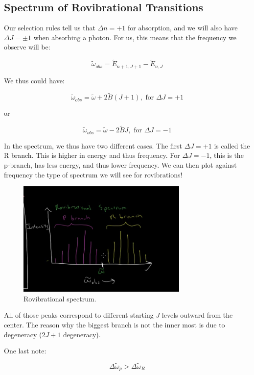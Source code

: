 \documentclass{article}
\newcommand{\be}{\begin{equation}}
\newcommand{\ee}{\end{equation}}
\begin{document}
\subsection{Spectrum of Rovibrational Transitions}

Our selection rules tell us that $\Delta n = +1$ for absorption, and we will also have $\Delta J = \pm 1$ when absorbing a photon. For us, this means that the frequency we observe will be:

\be
\tilde \omega_{obs} = \tilde E_{n+1, J+1} - \tilde E_{n, J}
\ee

We thus could have:

\be
\tilde \omega_{obs} = \tilde \omega + 2\tilde B \left(J+1\right), \text{ for } \Delta J = +1
\ee

or

\be
\tilde \omega_{obs} = \tilde \omega - 2\tilde B J, \text{ for } \Delta J = -1
\ee

In the spectrum, we thus have two different cases. The first $\Delta J = +1$ is called the R branch. This is higher in energy and thus frequency. For $\Delta J = -1$, this is the p-branch, has less energy, and thus lower frequency. We can then plot against frequency the type of spectrum we will see for rovibrations! 

 \begin{figure}
    \centering
    \includegraphics[width=0.75\textwidth]{Screen Shot 2020-09-27 at 6.27.05 PM.png}
    \caption{Rovibrational spectrum.}
    \label{fig:rovospec}
\end{figure}

All of those peaks correspond to different starting $J$ levels outward from the center. The reason why the biggest branch is not the inner most is due to degeneracy ($2J+1$ degeneracy).

One last note:

\be
\Delta \tilde \omega_p > \Delta \tilde \omega_R
\ee
\end{document}
